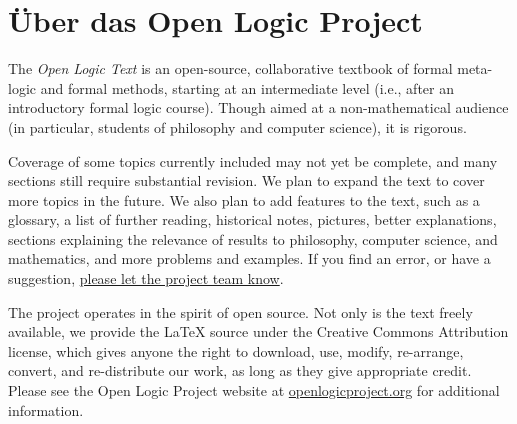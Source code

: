\chapter*{Über das Open Logic Project}


The \textit{Open Logic Text} is an open-source, collaborative textbook
of formal meta-logic and formal methods, starting at an intermediate level
(i.e., after an introductory formal logic course). Though aimed at a
non-mathematical audience (in particular, students of philosophy and
computer science), it is rigorous.

Coverage of some topics currently included may
not yet be complete, and many sections still require substantial
revision. We plan to expand the text to cover more topics in
the future. We also plan to add features to the text, such as a
glossary, a list of further reading, historical notes, pictures, better
explanations, sections explaining the relevance of results to
philosophy, computer science, and mathematics, and more problems and
examples. If you find an error, or have a suggestion,
\href{https://github.com/OpenLogicProject/OpenLogic/wiki/Contributing}{please let the project team know}.

The project operates in the spirit of open source. Not only is the
text freely available, we provide the LaTeX source under the
Creative Commons Attribution license, which gives anyone the right to
download, use, modify, re-arrange, convert, and re-distribute our
work, as long as they give appropriate credit.
Please see the Open Logic Project website at
\href{http://openlogicproject.org/}{openlogicproject.org} for
additional information.
